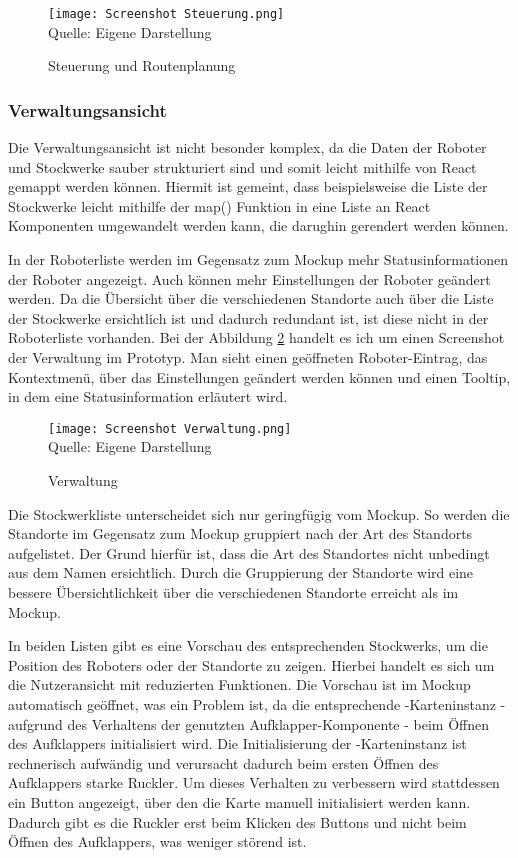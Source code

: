 \begin{figure}[H]
    \caption{Steuerung und Routenplanung}\label{fig:ControlsScreenshot}
    \texttt{[image: Screenshot Steuerung.png]}
    \\
    Quelle: Eigene Darstellung
\end{figure}

\subsubsection{Verwaltungsansicht}
Die Verwaltungsansicht ist nicht besonder komplex, da die Daten der Roboter und Stockwerke sauber strukturiert sind und somit leicht mithilfe von React gemappt werden können. Hiermit ist gemeint, dass beispielsweise die Liste der Stockwerke leicht mithilfe der map() Funktion in eine Liste an React Komponenten umgewandelt werden kann, die darughin gerendert werden können\cite{ReactMapping}.

In der Roboterliste werden im Gegensatz zum Mockup mehr Statusinformationen der Roboter angezeigt. Auch können mehr Einstellungen der Roboter geändert werden. Da die Übersicht über die verschiedenen Standorte auch über die Liste der Stockwerke ersichtlich ist und dadurch redundant ist, ist diese nicht in der Roboterliste vorhanden. Bei der Abbildung \ref{fig:RobotlistScreenshot} handelt es ich um einen Screenshot der Verwaltung im Prototyp. Man sieht einen geöffneten Roboter-Eintrag, das Kontextmenü, über das Einstellungen geändert werden können und einen Tooltip, in dem eine Statusinformation erläutert wird.

\begin{figure}[H]
    \caption{Verwaltung}\label{fig:RobotlistScreenshot}
    \texttt{[image: Screenshot Verwaltung.png]}
    \\
    Quelle: Eigene Darstellung
\end{figure}

Die Stockwerkliste unterscheidet sich nur geringfügig vom Mockup. So werden die Standorte im Gegensatz zum Mockup gruppiert nach der Art des Standorts aufgelistet. Der Grund hierfür ist, dass die Art des Standortes nicht unbedingt aus dem Namen ersichtlich. Durch die Gruppierung der Standorte wird eine bessere Übersichtlichkeit über die verschiedenen Standorte erreicht als im Mockup.

In beiden Listen gibt es eine Vorschau des entsprechenden Stockwerks, um die Position des Roboters oder der Standorte zu zeigen. Hierbei handelt es sich um die Nutzeransicht mit reduzierten Funktionen. Die Vorschau ist im Mockup automatisch geöffnet, was ein Problem ist, da die entsprechende \deckgl{}-Karteninstanz - aufgrund des Verhaltens der genutzten Aufklapper-Komponente - beim Öffnen des Aufklappers initialisiert wird. Die Initialisierung der \deckgl{}-Karteninstanz ist rechnerisch aufwändig und verursacht dadurch beim ersten Öffnen des Aufklappers starke Ruckler. Um dieses Verhalten zu verbessern wird stattdessen ein Button angezeigt, über den die Karte manuell initialisiert werden kann. Dadurch gibt es die Ruckler erst beim Klicken des Buttons und nicht beim Öffnen des Aufklappers, was weniger störend ist.

